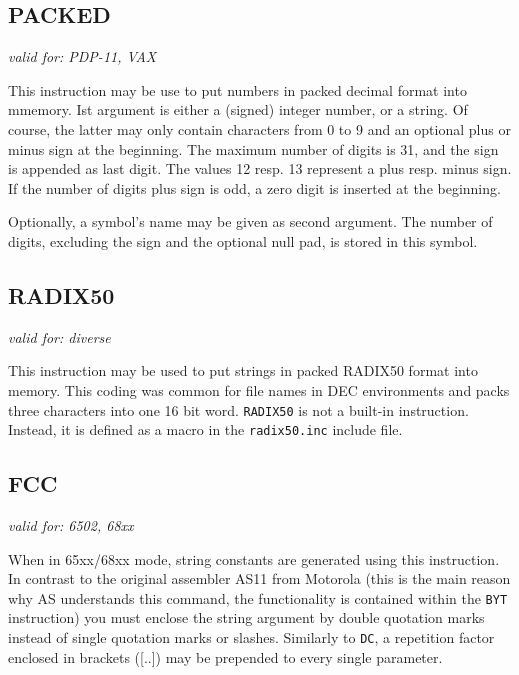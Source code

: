 \documentclass[12pt,twoside]{report}
\makeatletter
\newcommand{\tty}[1]{{\tt #1}}
\newcommand{\ttindex}[1]{\index{#1@{\tt #1}}}
\newcommand{\asname}{{AS}}
\makeatother
\begin{document}

\subsection{PACKED}

{\em valid for: PDP-11, VAX}

This instruction may be use to put numbers in packed decimal format into
mmemory. Ist argument is either a (signed) integer number, or a string.  Of
course, the latter may only contain characters from 0 to 9 and an optional
plus or minus sign at the beginning.  The maximum number of digits is 31,
and the sign is appended as last digit.  The values 12 resp. 13 represent 
a plus resp. minus sign. If the number of digits plus sign is odd, a zero
digit is inserted at the beginning.

Optionally, a symbol's name may be given as second argument.  The number of
digits, excluding the sign and the optional null pad, is stored in this
symbol.


\subsection{RADIX50}
\ttindex{RADIX50}

{\em valid for: diverse}

This instruction may be used to put strings in packed RADIX50 format into
memory.  This coding was common for file names in DEC environments and packs
three characters into one 16 bit word.  {\tt RADIX50} is not a built-in
instruction.  Instead, it is defined as a macro in the {\tt radix50.inc}
include file.


\subsection{FCC}
\ttindex{FCC}

{\em valid for: 6502, 68xx}

When in 65xx/68xx mode, string constants are generated using this
instruction. In contrast to the original assembler AS11 from Motorola
(this is the main reason why \asname{} understands this command, the
functionality is contained within the \tty{BYT} instruction) you must
enclose the string argument by double quotation marks instead of single
quotation marks or slashes.  Similarly to \tty{DC}, a repetition factor
enclosed in brackets ([..]) may be prepended to every single parameter.
\end{document}
